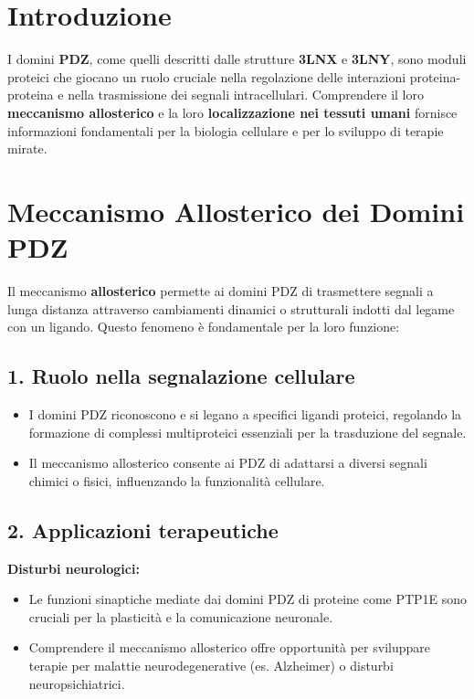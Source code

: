 \documentclass[Lau,binding=0.6cm,oneside,noexaminfo]{sapthesis}
\begin{document}
\section{Introduzione}
I domini \textbf{PDZ}, come quelli descritti dalle strutture \textbf{3LNX} e \textbf{3LNY}, sono moduli proteici che giocano un ruolo cruciale nella regolazione delle interazioni proteina-proteina e nella trasmissione dei segnali intracellulari. Comprendere il loro \textbf{meccanismo allosterico} e la loro \textbf{localizzazione nei tessuti umani} fornisce informazioni fondamentali per la biologia cellulare e per lo sviluppo di terapie mirate.

\section{Meccanismo Allosterico dei Domini PDZ}
Il meccanismo \textbf{allosterico} permette ai domini PDZ di trasmettere segnali a lunga distanza attraverso cambiamenti dinamici o strutturali indotti dal legame con un ligando. Questo fenomeno è fondamentale per la loro funzione:

\subsection{1. Ruolo nella segnalazione cellulare}
\begin{itemize}
    \item I domini PDZ riconoscono e si legano a specifici ligandi proteici, regolando la formazione di complessi multiproteici essenziali per la trasduzione del segnale.
    \item Il meccanismo allosterico consente ai PDZ di adattarsi a diversi segnali chimici o fisici, influenzando la funzionalità cellulare.
\end{itemize}

\subsection{2. Applicazioni terapeutiche}
\textbf{Disturbi neurologici:}
\begin{itemize}
    \item Le funzioni sinaptiche mediate dai domini PDZ di proteine come PTP1E sono cruciali per la plasticità e la comunicazione neuronale.
    \item Comprendere il meccanismo allosterico offre opportunità per sviluppare terapie per malattie neurodegenerative (es. Alzheimer) o disturbi neuropsichiatrici.
\end{itemize}
\end{document}
